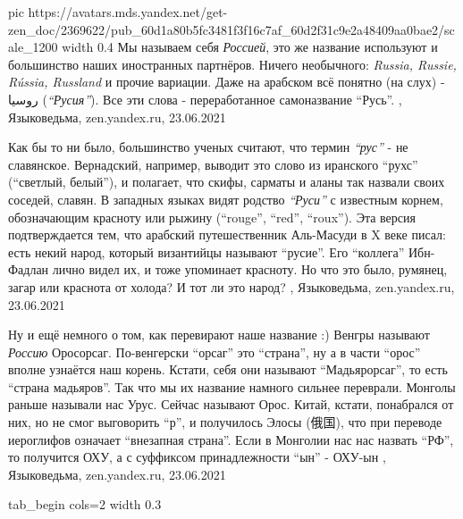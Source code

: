 \ifcmt
  pic https://avatars.mds.yandex.net/get-zen_doc/2369622/pub_60d1a80b5fc3481f3f16c7af_60d2f31c9e2a48409aa0bae2/scale_1200
  width 0.4
\fi
Мы называем себя \emph{Россией}, это же название используют и большинство наших
иностранных партнёров.  Ничего необычного: \emph{Russia, Russie, Rússia, Russland} и
прочие вариации. Даже на арабском всё понятно (на слух) - روسيا (\emph{\enquote{Русия}}). Все
эти слова - переработанное самоназвание \enquote{Русь}.
, 
Языковедьма, zen.yandex.ru, 23.06.2021

Как бы то ни было, большинство ученых считают, что термин \emph{\enquote{рус}} - не
славянское. Вернадский, например, выводит это слово из иранского \enquote{рухс}
(\enquote{светлый, белый}), и полагает, что скифы, сарматы и аланы так назвали своих
соседей, славян.  В западных языках видят родство \emph{\enquote{Руси}} с известным корнем,
обозначающим красноту или рыжину (\enquote{rouge}, \enquote{red}, \enquote{roux}). Эта версия
подтверждается тем, что арабский путешественник Аль-Масуди в X веке писал: есть
некий народ, который византийцы называют \enquote{русие}. Его \enquote{коллега} Ибн-Фадлан
лично видел их, и тоже упоминает красноту. Но что это было, румянец, загар или
краснота от холода? И тот ли это народ?
, 
Языковедьма, zen.yandex.ru, 23.06.2021

Ну и ещё немного о том, как перевирают наше название :) Венгры называют \emph{Россию}
Оросорсаг. По-венгерски \enquote{орсаг} это \enquote{страна}, ну а в части \enquote{орос} вполне
узнаётся наш корень. Кстати, себя они называют \enquote{Мадьярорсаг}, то есть \enquote{страна
мадьяров}. Так что мы их название намного сильнее переврали.  Монголы раньше
называли нас Урус. Сейчас называют Орос. Китай, кстати, понабрался от них, но
не смог выговорить \enquote{р}, и получилось Элосы (俄国), что при переводе иероглифов
означает \enquote{внезапная страна}.  Если в Монголии нас нас назвать \enquote{РФ}, то
получится ОХУ, а с суффиксом принадлежности \enquote{ын} - ОХУ-ын
, 
Языковедьма, zen.yandex.ru, 23.06.2021


\ifcmt
  tab_begin cols=2
  width 0.3

